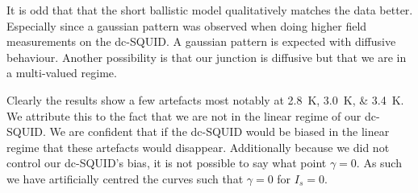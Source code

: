 It is odd that that the short ballistic model qualitatively matches the data better. Especially since a gaussian pattern was observed when doing higher field measurements on the dc-SQUID. A gaussian pattern is expected with diffusive behaviour. Another possibility is that our junction is diffusive but that we are in a multi-valued regime.

Clearly the results show a few artefacts most notably at \qtylist{2.8;3.0;3.4}{\kelvin}. We attribute this to the fact that we are not in the linear regime of our dc-SQUID. We are confident that if the dc-SQUID would be biased in the linear regime that these artefacts would disappear. Additionally because we did not control our dc-SQUID's bias, it is not possible to say what point $\gamma = 0$. As such we have artificially centred the curves such that $\gamma = 0$ for $I_s=0$.